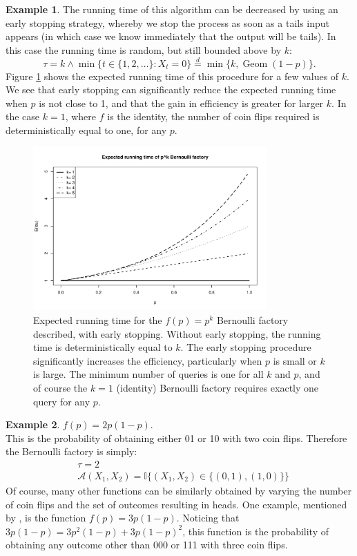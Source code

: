 \documentclass{article}
\theoremstyle{definition}
\newtheorem{example}{Example}
\newcommand{\eqdist}{\overset{d}{=}}
\newcommand{\Geom}{\operatorname{Geom}}
\newcommand{\A}{\mathcal{A}}
\begin{document}
\begin{example}
The running time of this algorithm can be decreased by using an early stopping strategy, whereby we stop the process as soon as a tails input appears (in which case we know immediately that the output will be tails). In this case the running time is random, but still bounded above by $k$:
\begin{equation*}
\tau = k \wedge \min\{t \in \{1,2,\dots\}:X_t=0 \} \eqdist \min\{k, \Geom(1-p)\}.
\end{equation*}
Figure \ref{fig:p2_runtime} shows the expected running time of this procedure for a few values of $k$. We see that early stopping can significantly reduce the expected running time when $p$ is not close to 1, and that the gain in efficiency is greater for larger $k$. In the case $k=1$, where $f$ is the identity, the number of coin flips required is deterministically equal to one, for any $p$.
\begin{figure}
\centering
\includegraphics[width=0.8\textwidth]{pk_runtime.pdf}
\caption{Expected running time for the $f(p)=p^k$ Bernoulli factory described, with early stopping. Without early stopping, the running time is deterministically equal to $k$. The early stopping procedure significantly increases the efficiency, particularly when $p$ is small or $k$ is large. The minimum number of queries is one for all $k$ and $p$, and of course the $k=1$ (identity) Bernoulli factory requires exactly one query for any $p$.}\label{fig:p2_runtime}
\end{figure}
\end{example}

\begin{example}\label{ex:bf3}
$f(p) = 2p(1-p)$.\\
This is the probability of obtaining either 01 or 10 with two coin flips. Therefore the Bernoulli factory is simply:
\begin{align*}
& \tau = 2 \\
& \A(X_1,X_2) = \mathbb{I}\{(X_1,X_2) \in \{(0,1),(1,0)\} \}
\end{align*}
Of course, many other functions can be similarly obtained by varying the number of coin flips and the set of outcomes resulting in heads. One example, mentioned by \citet{patel2018}, is the function $f(p) = 3p(1-p)$. Noticing that $3p(1-p) = 3p^2(1-p) + 3p(1-p)^2$, this function is the probability of obtaining any outcome other than 000 or 111 with three coin flips.
\end{example}
\end{document}
